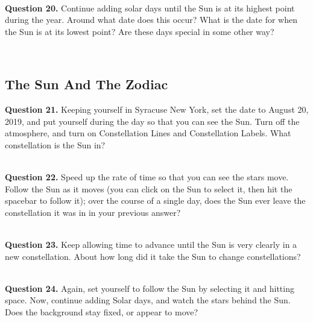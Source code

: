 \documentclass[11pt]{article}
\begin{document}
\hrulefill\\

\textbf{Question 20.} Continue adding solar days until the Sun is at its highest point during the year. Around what date does this occur? What is the date for when the Sun is at its lowest point? Are these days special in some other way?\\
\vspace*{1.5cm}

\hrulefill\\

\newpage

\subsection{The Sun And The Zodiac}

\textbf{Question 21.} Keeping yourself in Syracuse New York, set the date to August 20, 2019, and put yourself during the day so that you can see the Sun. Turn off the atmosphere, and turn on Constellation Lines and Constellation Labels. What constellation is the Sun in? \\
\vspace*{1.5cm}

\hrulefill\\

\textbf{Question 22.} Speed up the rate of time so that you can see the stars move. Follow the Sun as it moves (you can click on the Sun to select it, then hit the spacebar to follow it); over the course of a single day, does the Sun ever leave the constellation it was in in your previous answer? \\
\vspace*{1.5cm}

\hrulefill\\

\textbf{Question 23.} Keep allowing time to advance until the Sun is very clearly in a new constellation. About how long did it take the Sun to change constellations? \\
\vspace*{1.5cm}

\hrulefill\\

\textbf{Question 24.} Again, set yourself to follow the Sun by selecting it and hitting space. Now, continue adding Solar days, and watch the stars behind the Sun. Does the background stay fixed, or appear to move? \\
\vspace*{1.5cm}
\end{document}
